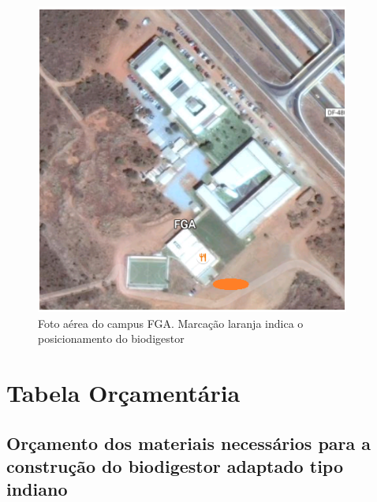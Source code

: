 \begin{figure}[!htb]
\centering
\includegraphics[width=0.75\paperwidth]{figuras/PosicaoBiodigestor.png}
\caption{Foto aérea do campus FGA. Marcação laranja indica o posicionamento do biodigestor}
\label{fig:area}
\end{figure}

\chapter[Tabela Orçamentária]{Tabela Orçamentária}

\section {Orçamento dos materiais necessários para a construção do biodigestor adaptado tipo indiano}

